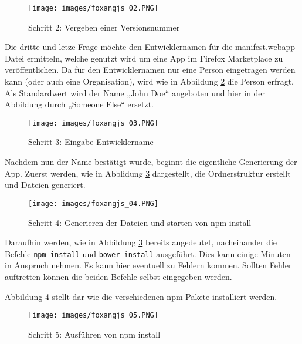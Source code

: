 \begin{figure}[!ht]
  \centering
    \texttt{[image: images/foxangjs\_02.PNG]}\\
  \caption{Schritt 2: Vergeben einer Versionsnummer}
  \label{fig:foxangjs2}
\end{figure}

Die dritte und letze Frage möchte den Entwicklernamen für die manifest.webapp-Datei ermitteln, welche genutzt wird um eine App im Firefox Marketplace zu veröffentlichen.
Da für den Entwicklernamen nur eine Person eingetragen werden kann (oder auch eine Organisation), wird wie in Abbildung \ref{fig:foxangjs3} die Person erfragt.
Als Standardwert wird der Name „John Doe“ angeboten und hier in der Abbildung durch „Someone Else“ ersetzt.

\begin{figure}[!ht]
  \centering
    \texttt{[image: images/foxangjs\_03.PNG]}\\
  \caption{Schritt 3: Eingabe Entwicklername}
  \label{fig:foxangjs3}
\end{figure}

Nachdem nun der Name bestätigt wurde, beginnt die eigentliche Generierung der App.
Zuerst werden, wie in Abblidung \ref{fig:foxangjs4} dargestellt, die Ordnerstruktur erstellt und Dateien generiert. \\

\begin{figure}[!ht]
  \centering
    \texttt{[image: images/foxangjs\_04.PNG]}\\
  \caption{Schritt 4: Generieren der Dateien und starten von npm install}
  \label{fig:foxangjs4}
\end{figure}

Daraufhin werden, wie in Abbildung \ref{fig:foxangjs4} bereits angedeutet, nacheinander die Befehle \texttt{npm install} und \texttt{bower install} ausgeführt.
Dies kann einige Minuten in Anspruch nehmen.
Es kann hier eventuell zu Fehlern kommen.
Sollten Fehler auftretten können die beiden Befehle selbst eingegeben werden.

Abbildung \ref{fig:foxangjs5} stellt dar wie die verschiedenen npm-Pakete installiert werden. \\

\begin{figure}[!ht]
  \centering
    \texttt{[image: images/foxangjs\_05.PNG]}\\
  \caption{Schritt 5: Ausführen von npm install}
  \label{fig:foxangjs5}
\end{figure}

